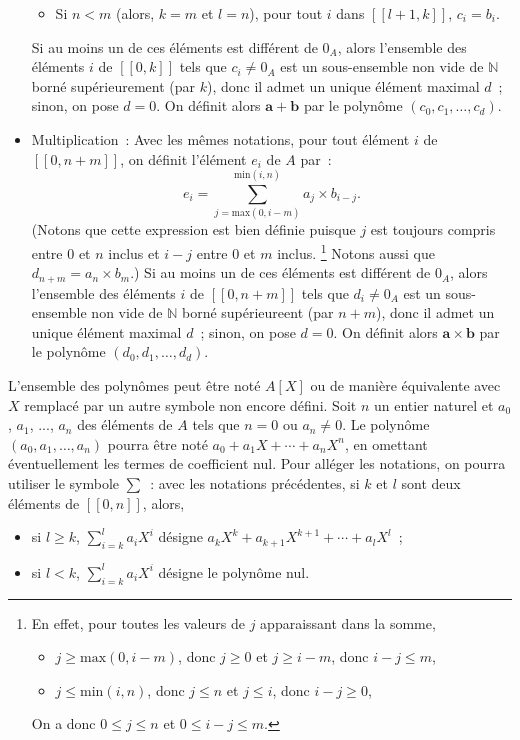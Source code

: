 \begin{itemize}[nosep]
\begin{itemize}[nosep]
                \item Si $n < m$ (alors, $k = m$ et $l = n$), pour tout $i$ dans $[\![l+1, k]\!]$, $c_i = b_i$.
            \end{itemize}
            Si au moins un de ces éléments est différent de $0_A$, alors l'ensemble des éléments $i$ de $[\![0, k]\!]$ tels que $c_i \neq 0_A$ est un sous-ensemble non vide de $\mathbb{N}$ borné supérieurement (par $k$), donc il admet un unique élément maximal $d$ ; sinon, on pose $d = 0$.
            On définit alors $\mathbf{a} + \mathbf{b}$ par le polynôme $(c_0, c_1, \dots, c_d)$.
        \item Multiplication : Avec les mêmes notations, pour tout élément $i$ de $[\![0, n+m]\!]$, on définit l'élément $e_i$ de $A$ par :
            \begin{equation*}
                e_i = \sum_{j=\mathrm{max}(0,i-m)}^{\mathrm{min}(i,n)} a_j \times b_{i-j}.
            \end{equation*}
            (Notons que cette expression est bien définie puisque $j$ est toujours compris entre $0$ et $n$ inclus et $i-j$ entre $0$ et $m$ inclus.%
            \footnote{
                En effet, pour toutes les valeurs de $j$ apparaissant dans la somme, 
                \begin{itemize}[nosep]
                    \item $j \geq \mathrm{max}(0, i-m)$, donc $j \geq 0$ et $j \geq i-m$, donc $i-j \leq m$, 
                    \item $j \leq \mathrm{min}(i, n)$, donc $j \leq n$ et $j \leq i$, donc $i-j \geq 0$, 
                \end{itemize}
                On a donc $0 \leq j \leq n$ et $0 \leq i-j \leq m$.
            }
            Notons aussi que $d_{n+m} = a_n \times b_m$.)
            Si au moins un de ces éléments est différent de $0_A$, alors l'ensemble des éléments $i$ de $[\![0, n+m]\!]$ tels que $d_i \neq 0_A$ est un sous-ensemble non vide de $\mathbb{N}$ borné supérieureent (par $n+m$), donc il admet un unique élément maximal $d$ ; sinon, on pose $d = 0$.
            On définit alors $\mathbf{a} \times \mathbf{b}$ par le polynôme $(d_0, d_1, \dots, d_d)$.
    \end{itemize}
    L'ensemble des polynômes peut être noté $A[X]$ ou de manière équivalente avec $X$ remplacé par un autre symbole non encore défini. 
    Soit $n$ un entier naturel et $a_0$, $a_1$, ..., $a_n$ des éléments de $A$ tels que $n = 0$ ou $a_n \neq 0$.
    Le polynôme $(a_0, a_1, \dots, a_n)$ pourra être noté $a_0 + a_1 X + \cdots + a_n X^n$, en omettant éventuellement les termes de coefficient nul.
    Pour alléger les notations, on pourra utiliser le symbole $\sum$ : avec les notations précédentes, si $k$ et $l$ sont deux éléments de $[\![0, n]\!]$, alors, 
    \begin{itemize}[nosep]
        \item si $l \geq k$, $\sum_{i=k}^l a_i X^i$ désigne $a_k X^k + a_{k+1} X^{k+1} + \cdots + a_l X^l$ ;
        \item si $l < k$, $\sum_{i=k}^l a_i X^i$ désigne le polynôme nul.
    \end{itemize}

